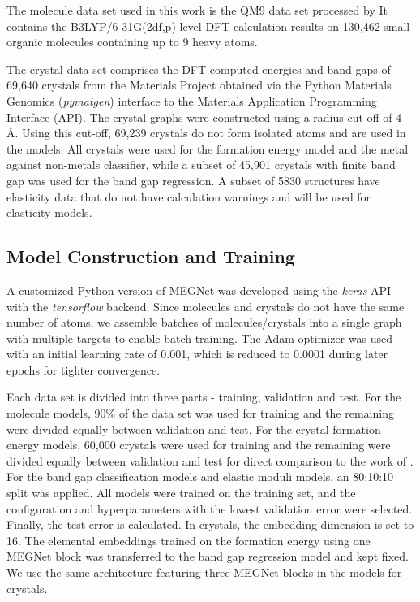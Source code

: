 \documentclass[manuscript=article]{achemso}
\begin{document}
The molecule data set used in this work is the QM9 data set\cite{Ramakrishnan2014} processed by \citet{Faber2017} It contains the B3LYP/6-31G(2df,p)-level DFT calculation results on 130,462 small organic molecules containing up to 9 heavy atoms.

The crystal data set comprises the DFT-computed energies and band gaps of 69,640 crystals from the Materials Project\cite{Jain2013} obtained via the Python Materials Genomics (\textit{pymatgen})\cite{Ong2013a} interface to the Materials Application Programming Interface (API)\cite{ong2015materials}. The crystal graphs were constructed using a radius cut-off of 4 \AA. Using this cut-off, 69,239 crystals do not form isolated atoms and are used in the models. All crystals were used for the formation energy model and the metal against non-metals classifier, while a subset of 45,901 crystals with finite band gap was used for the band gap regression. A subset of 5830 structures have elasticity data that do not have calculation warnings and will be used for elasticity models. 

\subsection{Model Construction and Training}

A customized Python version of MEGNet was developed using the \textit{keras} API\cite{chollet2015keras} with the \textit{tensorflow} backend.\cite{Abadi2016} Since molecules and crystals do not have the same number of atoms, we assemble batches of molecules/crystals into a single graph with multiple targets to enable batch training. The Adam optimizer\cite{Kingma2014} was used with an initial learning rate of 0.001, which is reduced to 0.0001 during later epochs for tighter convergence. 

Each data set is divided into three parts - training, validation and test. For the molecule models, 90\% of the data set was used for training and the remaining were divided equally between validation and test. For the crystal formation energy models, 60,000 crystals were used for training and the remaining were divided equally between validation and test for direct comparison to the work of \citet{Schutt2018}. For the band gap classification models and elastic moduli models, an 80:10:10 split was applied. All models were trained on the training set, and the configuration and hyperparameters with the lowest validation error were selected. Finally, the test error is calculated. In crystals, the embedding dimension is set to 16. The elemental embeddings trained on the formation energy using one MEGNet block was transferred to the band gap regression model and kept fixed. We use the same architecture featuring three MEGNet blocks in the models for crystals. 
\end{document}
